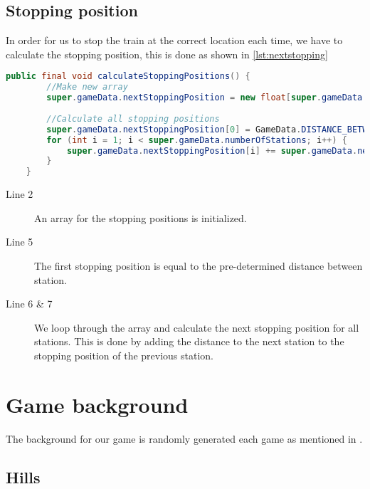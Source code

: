 \subsection{Stopping position}

In order for us to stop the train at the correct location each time, we have to calculate the stopping position, this is done as shown in \autoref{lst:nextstopping}

\begin{lstlisting}[language=java,firstnumber=1,caption={Smoke clouds getting reset based on time intervals},label=lst:nextstopping]
    public final void calculateStoppingPositions() {        
        //Make new array
        super.gameData.nextStoppingPosition = new float[super.gameData.numberOfStations + 1];
        
        //Calculate all stopping positions
        super.gameData.nextStoppingPosition[0] = GameData.DISTANCE_BETWEEN_STATIONS;
        for (int i = 1; i < super.gameData.numberOfStations; i++) {
            super.gameData.nextStoppingPosition[i] += super.gameData.nextStoppingPosition[i-1] + GameData.DISTANCE_BETWEEN_STATIONS;
        }
    }
\end{lstlisting}

\begin{description}
\item[Line 2] An array for the stopping positions is initialized. 
\item[Line 5] The first stopping position is equal to the pre-determined distance between station. 
\item[Line 6 \& 7] We loop through the array and calculate the next stopping position for all stations. This is done by adding the distance to the next station to the stopping position of the previous station.
\end{description}

\section{Game background}

The background for our game is randomly generated each game as mentioned in . 

\subsection{Hills}

